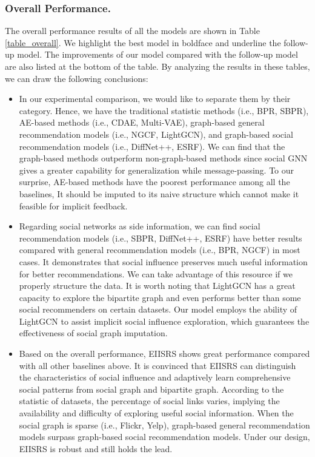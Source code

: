 \documentclass[letterpaper]{article} %
\begin{document}
\subsubsection{Overall Performance.}
The overall performance results of all the models are shown in Table \ref{table_overall}. We highlight the best model in boldface and underline the follow-up model. The improvements of our model compared with the follow-up model are also listed at the bottom of the table. By analyzing the results in these tables, we can draw the following conclusions:
\begin{itemize}
    \item In our experimental comparison, we would like to separate them by their category. Hence, we have the traditional statistic methods (i.e., BPR, SBPR), AE-based methods (i.e., CDAE, Multi-VAE), graph-based general recommendation models (i.e., NGCF, LightGCN), and graph-based social recommendation models (i.e., DiffNet++, ESRF). We can find that the graph-based methods outperform non-graph-based methods since social GNN gives a greater capability for generalization while message-passing. To our surprise, AE-based methods have the poorest performance among all the baselines, It should be imputed to its naive structure which cannot make it feasible for implicit feedback.
    \item Regarding social networks as side information, we can find social recommendation models (i.e., SBPR, DiffNet++, ESRF) have better results compared with general recommendation models (i.e., BPR, NGCF) in most cases. It demonstrates that social influence preserves much useful information for better recommendations. We can take advantage of this resource if we properly structure the data. It is worth noting that LightGCN has a great capacity to explore the bipartite graph and even performs better than some social recommenders on certain datasets. Our model employs the ability of LightGCN to assist implicit social influence exploration, which guarantees the effectiveness of social graph imputation.
    \item Based on the overall performance, EIISRS shows great performance compared with all other baselines above. It is convinced that EIISRS can distinguish the characteristics of social influence and adaptively learn comprehensive social patterns from social graph and bipartite graph. According to the statistic of datasets, the percentage of social links varies, implying the availability and difficulty of exploring useful social information. When the social graph is sparse (i.e., Flickr, Yelp), graph-based general recommendation models surpass graph-based social recommendation models. Under our design, EIISRS is robust and still holds the lead.
\end{itemize} 
\end{document}
